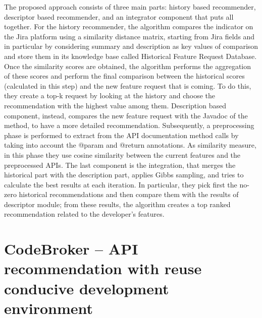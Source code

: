 The proposed approach consists of three main parts: history based recommender, 
descriptor based recommender, and an integrator component that puts all 
together. For the history recommender, the algorithm compares the indicator on 
the Jira platform using a similarity distance matrix, starting from Jira fields 
and in particular by considering summary and description as key values of 
comparison and store them in its knowledge base called Historical Feature 
Request Database. Once the similarity scores are obtained, the algorithm 
performs the aggregation of these scores and perform the final comparison 
between the historical scores (calculated in this step) and the new feature 
request that is coming. To do this, they create a top-k request by looking at 
the history and choose the recommendation with the highest value among them. 
Description based component, instead, compares the new feature request with the 
Javadoc of the method, to have a more detailed recommendation. Subsequently, a 
preprocessing phase is performed to extract from the API documentation method 
calls by taking into account the @param and @return annotations. As similarity 
measure, in this phase they use cosine similarity between the current features 
and the preprocessed APIs. The last component is the integration, that merges 
the historical part with the description part, applies Gibbs sampling, and 
tries to calculate the best results at each iteration. In particular, they pick 
first the no-zero historical recommendations and then compare them with the 
results of descriptor module; from these results, the algorithm creates a top 
ranked recommendation related to the developer's features. 



\section{CodeBroker -- API recommendation 
with reuse conducive development 
environment}

